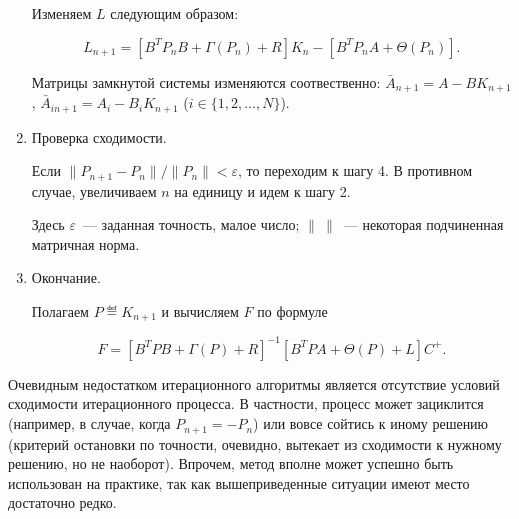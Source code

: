 \begin{alg}
\begin{enumerate}
Изменяем $L$ следующим образом:

\begin{equation}
\label{eq:4/20}
L_{n+1} =[B^TP_nB + \Gamma(P_n) + R]K_n - [B^TP_nA + \Theta(P_n)]\mbox{.}
\end{equation}

Матрицы замкнутой системы изменяются соотвественно: $\bar{A}_{n+1}=A - BK_{n+1}$, $\bar{A}_{in+1} = A_i - B_iK_{n+1}$ ($i \in \{1,2,\ldots,N\}$).


\item
Проверка сходимости.\br

Если $\|P_{n+1}-P_n\| / \|P_n\| < \varepsilon$, то переходим к шагу 4. В противном случае, увеличиваем $n$ на единицу и идем к шагу 2.

Здесь $\varepsilon$~--- заданная точность, малое число; $\|~\|$~--- некоторая подчиненная матричная норма.



\item
Окончание.\br

Полагаем $P \eqdef K_{n+1}$ и вычисляем $F$ по формуле

\begin{equation}
\label{eq:4/21}
F = [B^TPB + \Gamma(P) + R]^{-1}[B^TPA + \Theta(P) + L]C^+\mbox{.}
\end{equation}

\end{enumerate}
\end{alg}

Очевидным недостатком итерационного алгоритмы является отсутствие условий сходимости итерационного процесса. В частности, процесс может зациклится (например, в случае, когда $P_{n+1} = -P_n$) или вовсе сойтись к иному решению (критерий остановки по точности, очевидно, вытекает из сходимости к нужному решению, но не наоборот). Впрочем, метод вполне может успешно быть использован на практике, так как вышеприведенные ситуации имеют место достаточно редко.
